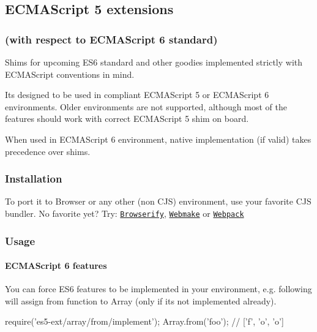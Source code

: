\subsection*{E\+C\+M\+A\+Script 5 extensions}

\subsubsection*{(with respect to E\+C\+M\+A\+Script 6 standard)}

Shims for upcoming E\+S6 standard and other goodies implemented strictly with E\+C\+M\+A\+Script conventions in mind.

It\textquotesingle{}s designed to be used in compliant E\+C\+M\+A\+Script 5 or E\+C\+M\+A\+Script 6 environments. Older environments are not supported, although most of the features should work with correct E\+C\+M\+A\+Script 5 shim on board.

When used in E\+C\+M\+A\+Script 6 environment, native implementation (if valid) takes precedence over shims.

\subsubsection*{Installation}



To port it to Browser or any other (non C\+JS) environment, use your favorite C\+JS bundler. No favorite yet? Try\+: \href{http://browserify.org/}{\tt Browserify}, \href{https://github.com/medikoo/modules-webmake}{\tt Webmake} or \href{http://webpack.github.io/}{\tt Webpack}

\subsubsection*{Usage}

\paragraph*{E\+C\+M\+A\+Script 6 features}

You can force E\+S6 features to be implemented in your environment, e.\+g. following will assign {\ttfamily from} function to {\ttfamily Array} (only if it\textquotesingle{}s not implemented already).


\begin{DoxyCode}
require('es5-ext/array/from/implement');
Array.from('foo'); // ['f', 'o', 'o']
\end{DoxyCode}


